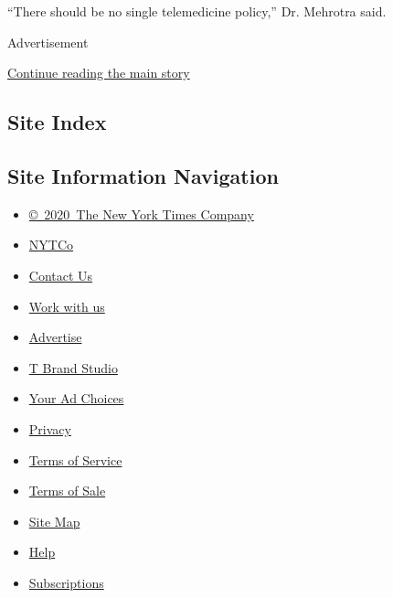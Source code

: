 ``There should be no single telemedicine policy,'' Dr. Mehrotra said.

Advertisement

\protect\hyperlink{after-bottom}{Continue reading the main story}

\hypertarget{site-index}{%
\subsection{Site Index}\label{site-index}}

\hypertarget{site-information-navigation}{%
\subsection{Site Information
Navigation}\label{site-information-navigation}}

\begin{itemize}
\tightlist
\item
  \href{https://help.nytimes3xbfgragh.onion/hc/en-us/articles/115014792127-Copyright-notice}{©~2020~The
  New York Times Company}
\end{itemize}

\begin{itemize}
\tightlist
\item
  \href{https://www.nytco.com/}{NYTCo}
\item
  \href{https://help.nytimes3xbfgragh.onion/hc/en-us/articles/115015385887-Contact-Us}{Contact
  Us}
\item
  \href{https://www.nytco.com/careers/}{Work with us}
\item
  \href{https://nytmediakit.com/}{Advertise}
\item
  \href{http://www.tbrandstudio.com/}{T Brand Studio}
\item
  \href{https://www.nytimes3xbfgragh.onion/privacy/cookie-policy\#how-do-i-manage-trackers}{Your
  Ad Choices}
\item
  \href{https://www.nytimes3xbfgragh.onion/privacy}{Privacy}
\item
  \href{https://help.nytimes3xbfgragh.onion/hc/en-us/articles/115014893428-Terms-of-service}{Terms
  of Service}
\item
  \href{https://help.nytimes3xbfgragh.onion/hc/en-us/articles/115014893968-Terms-of-sale}{Terms
  of Sale}
\item
  \href{https://spiderbites.nytimes3xbfgragh.onion}{Site Map}
\item
  \href{https://help.nytimes3xbfgragh.onion/hc/en-us}{Help}
\item
  \href{https://www.nytimes3xbfgragh.onion/subscription?campaignId=37WXW}{Subscriptions}
\end{itemize}
